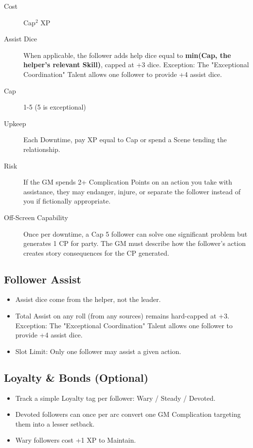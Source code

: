 \begin{description}
\item[Cost] Cap$^2$ XP
\item[Assist Dice] When applicable, the follower adds help dice equal to \textbf{min(Cap, the helper's relevant Skill)}, capped at +3 dice. Exception: The "Exceptional Coordination" Talent allows one follower to provide +4 assist dice.
\item[Cap] 1-5 (5 is exceptional)
\item[Upkeep] Each Downtime, pay XP equal to Cap or spend a Scene tending the relationship.
\item[Risk] If the GM spends 2+ Complication Points on an action you take with assistance, they may endanger, injure, or separate the follower instead of you if fictionally appropriate.
\item[Off-Screen Capability] Once per downtime, a Cap 5 follower can solve one significant problem but generates 1 CP for party. The GM must describe how the follower's action creates story consequences for the CP generated.
\end{description}

\subsection{Follower Assist}
\begin{itemize}
    \item Assist dice come from the helper, not the leader.
    \item Total Assist on any roll (from any sources) remains hard-capped at +3. Exception: The "Exceptional Coordination" Talent allows one follower to provide +4 assist dice.
    \item Slot Limit: Only one follower may assist a given action.
\end{itemize}

\subsection{Loyalty \& Bonds (Optional)}
\begin{itemize}
    \item Track a simple Loyalty tag per follower: Wary / Steady / Devoted.
    \item Devoted followers can once per arc convert one GM Complication targeting them into a lesser setback.
    \item Wary followers cost +1 XP to Maintain.
\end{itemize}


